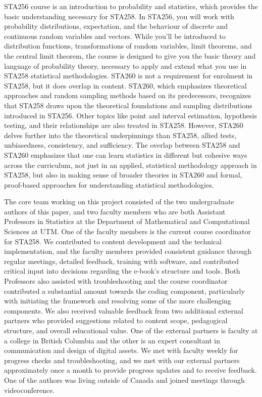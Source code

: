 \documentclass[11pt]{article}
\begin{document}
STA256 course is an introduction to probability and statistics, which provides the basic understanding necessary for STA258. In STA256, you will work with probability distributions, expectation, and the behaviour of discrete and continuous random variables and vectors. While you'll be introduced to distribution functions, transformations of random variables, limit theorems, and the central limit theorem, the course is designed to give you the basic theory and language of probability theory, necessary to apply and extend what you use in STA258 statistical methodologies. STA260 is not a requirement for enrolment in STA258, but it does overlap in content. STA260, which emphasizes theoretical approaches and random sampling methods based on its predecessors, recognizes that STA258 draws upon the theoretical foundations and sampling distributions introduced in STA256. Other topics like point and interval estimation, hypothesis testing, and their relationships are also treated in STA258. However, STA260 delves further into the theoretical underpinnings than STA258, allied tests, unbiasedness, consistency, and sufficiency. The overlap between STA258 and STA260 emphasizes that one can learn statistics in different but cohesive ways across the curriculum, not just in an applied, statistical methodology approach in STA258, but also in making sense of broader theories in STA260 and formal, proof-based approaches for understanding statistical methodologies.

The core team working on this project consisted of the two undergraduate authors of this paper, and two faculty members who are both Assistant Professors in Statistics at the Department of Mathematical and Computational Sciences at UTM. One of the faculty members is the current course coordinator for STA258.
We contributed to content development and the technical implementation, and the faculty members provided consistent guidance through regular meetings, detailed feedback, training with software, and contributed critical input into decisions regarding the e-book’s structure and tools.
Both Professors also assisted with troubleshooting and the course coordinator contributed a substantial amount towards the coding component, particularly with initiating the framework and resolving some of the more challenging components.
We also received valuable feedback from two additional external partners 
who provided suggestions related to content scope, pedagogical structure, and overall educational value.
One of the external partners is faculty at a college in British Columbia and the other is an expert consultant in communication and design of digital assets.
We met with faculty weekly for progress checks and troubleshooting, and we met with our external partners approximately once a month to provide progress updates and to receive feedback.
One of the authors was living outside of Canada and joined meetings through videoconference.
\end{document}
